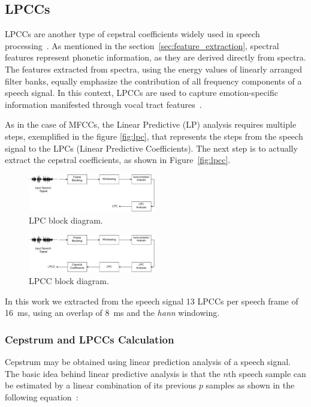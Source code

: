 \subsection{LPCCs}
LPCCs are another type of cepstral coefficients widely used in speech processing~\cite{jahangir:review}. As mentioned in the section~\vref{sec:feature_extraction}, spectral features represent phonetic information, as they are derived directly from spectra. The features extracted from spectra, using the energy values of linearly arranged filter banks, equally emphasize the contribution of all frequency components of a speech signal. In this context, LPCCs are used to capture emotion-specific information manifested through vocal tract features~\cite{rao:spectral}.

As in the case of MFCCs, the Linear Predictive (LP) analysis requires multiple steps, exemplified in the figure \vref{fig:lpc}, that represents the steps from the speech signal to the LPCs (Linear Predictive Coefficients). The next step is to actually extract the cepstral coefficients, as shown in Figure~\vref{fig:lpcc}.
\begin{figure}
	\includegraphics[width=0.5\textwidth]{images/lpc}
	\caption{LPC block diagram.}
	\label{fig:lpc}
\end{figure}
\begin{figure}
	\includegraphics[width=0.5\textwidth]{images/lpcc}
	\caption{LPCC block diagram.}
	\label{fig:lpcc}
\end{figure}

In this work we extracted from the speech signal 13 LPCCs per speech frame of \SI{16}{ms}, using an overlap of \SI{8}{ms} and the \textit{hann} windowing.

\subsubsection{Cepstrum and LPCCs Calculation}

Cepstrum may be obtained using linear prediction analysis of a speech signal. The basic idea behind linear predictive analysis is that the $n$th speech sample can be
estimated by a linear combination of its previous $p$ samples as shown in the following equation~\cite{rao:spectral}:

